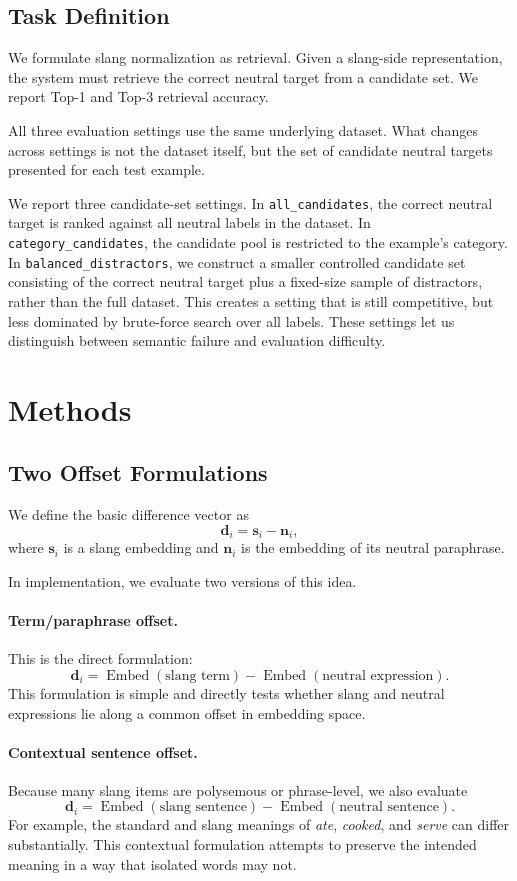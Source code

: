 \documentclass{article}
\begin{document}
\subsection{Task Definition}
We formulate slang normalization as retrieval.
Given a slang-side representation, the system must retrieve the correct neutral target from a candidate set.
We report Top-1 and Top-3 retrieval accuracy.

All three evaluation settings use the same underlying dataset.
What changes across settings is not the dataset itself, but the set of candidate neutral targets presented for each test example.

We report three candidate-set settings.
In \texttt{all\_candidates}, the correct neutral target is ranked against all neutral labels in the dataset.
In \texttt{category\_candidates}, the candidate pool is restricted to the example's category.
In \texttt{balanced\_distractors}, we construct a smaller controlled candidate set consisting of the correct neutral target plus a fixed-size sample of distractors, rather than the full dataset.
This creates a setting that is still competitive, but less dominated by brute-force search over all labels.
These settings let us distinguish between semantic failure and evaluation difficulty.

\section{Methods}
\subsection{Two Offset Formulations}
We define the basic difference vector as
\[
\mathbf{d}_i = \mathbf{s}_i - \mathbf{n}_i,
\]
where $\mathbf{s}_i$ is a slang embedding and $\mathbf{n}_i$ is the embedding of its neutral paraphrase.

In implementation, we evaluate two versions of this idea.

\paragraph{Term/paraphrase offset.}
This is the direct formulation:
\[
\mathbf{d}_i =
\operatorname{Embed}(\text{slang term})
-
\operatorname{Embed}(\text{neutral expression}).
\]
This formulation is simple and directly tests whether slang and neutral expressions lie along a common offset in embedding space.

\paragraph{Contextual sentence offset.}
Because many slang items are polysemous or phrase-level, we also evaluate
\[
\mathbf{d}_i =
\operatorname{Embed}(\text{slang sentence})
-
\operatorname{Embed}(\text{neutral sentence}).
\]
For example, the standard and slang meanings of \emph{ate}, \emph{cooked}, and \emph{serve} can differ substantially.
This contextual formulation attempts to preserve the intended meaning in a way that isolated words may not.
\end{document}

